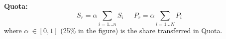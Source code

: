 \begin{f}
\textbf{Quota:}
$$
S_r=\alpha \sum_{i=1\ldots n}S_i\quad \ \ P_r=\alpha\sum_{i=1\ldots N}P_i 
$$
where $\alpha\ \in [0,1]$ (25\% in the figure) is the share transferred in Quota.
	

	

\end{f}
